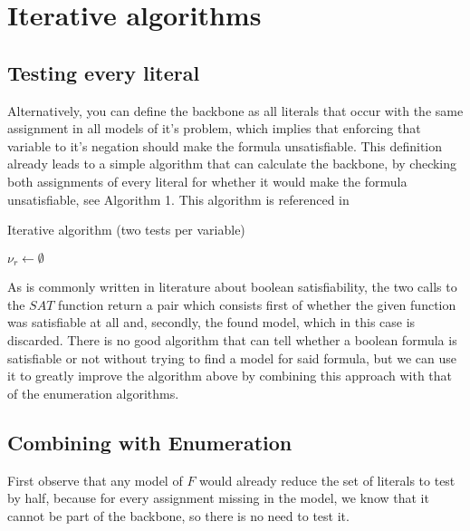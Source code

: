 \section{Iterative algorithms}
\subsection{Testing every literal}
Alternatively, you can define the backbone as all literals that occur with the same assignment in all models of it's problem, which implies that enforcing that variable to it's negation should make the formula unsatisfiable. This definition already leads to a simple algorithm that can calculate the backbone, by checking both assignments of every literal for whether it would make the formula unsatisfiable, see Algorithm 1. This algorithm is referenced in \cite{mjl10}
\begin{algorithm}
\caption{{\sc Iterative algorithm (two tests per variable)}}
\DontPrintSemicolon
{}
$\nu_r \gets \emptyset$\;
\;
\end{algorithm}

As is commonly written in literature about boolean satisfiability, the two calls to the $SAT$ function return a pair which consists first of whether the given function was satisfiable at all and, secondly, the found model, which in this case is discarded. There is no good algorithm that can tell whether a boolean formula is satisfiable or not without trying to find a model for said formula, but we can use it to greatly improve the algorithm above by combining this approach with that of the enumeration algorithms.

\subsection{Combining with Enumeration}
First observe that any model of $F$ would already reduce the set of literals to test by half, because for every assignment missing in the model, we know that it cannot be part of the backbone, so there is no need to test it. 

